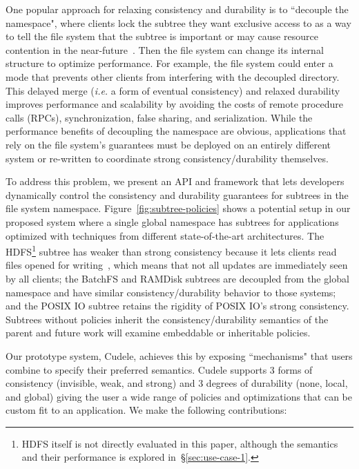 One popular approach for relaxing consistency and durability is to ``decouple
the namespace", where clients lock the subtree they want exclusive access to as
a way to tell the file system that the subtree is important or may cause
resource contention in the near-future~\cite{grider:pdsw2015-marfs,
zheng:pdsw2015-deltafs, zheng:pdsw2014-batchfs, ren:sc2014-indexfs,
bent:slides-twotiers}. Then the file system can change its internal structure
to optimize performance. For example, the file system could enter a mode that
prevents other clients from interfering with the decoupled directory.  This
delayed merge ({\it i.e.} a form of eventual consistency) and relaxed
durability improves performance and scalability by avoiding the costs of remote
procedure calls (RPCs), synchronization, false sharing, and serialization.
While the performance benefits of decoupling the namespace are obvious,
applications that rely on the file system's guarantees must be deployed on an
entirely different system or re-written to coordinate strong
consistency/durability themselves.

To address this problem, we present an API and framework that lets developers
dynamically control the consistency and durability guarantees for subtrees in
the file system namespace.  Figure~\ref{fig:subtree-policies} shows a potential
setup in our proposed system where a single global namespace has subtrees for
applications optimized with techniques from different state-of-the-art
architectures.  The HDFS\footnote{HDFS itself is not directly evaluated in this
paper, although the semantics and their performance is explored
in~\S\ref{sec:use-case-1}.} subtree has weaker than strong consistency because
it lets clients read files opened for
writing~\cite{hakimzadeh:dais14-hdfs-consistency}, which means that not all
updates are immediately seen by all clients; the BatchFS and RAMDisk subtrees
are decoupled from the global namespace and have similar consistency/durability
behavior to those systems; and the POSIX IO subtree retains the rigidity of
POSIX IO's strong consistency.  Subtrees without policies inherit the
consistency/durability semantics of the parent and future work will examine
embeddable or inheritable policies.

Our prototype system, Cudele, achieves this by exposing ``mechanisms" that
users combine to specify their preferred semantics.  Cudele supports 3 forms
of consistency (invisible, weak, and strong) and 3 degrees of durability (none,
local, and global) giving the user a wide range of policies and optimizations
that can be custom fit to an application. We make the following contributions:

